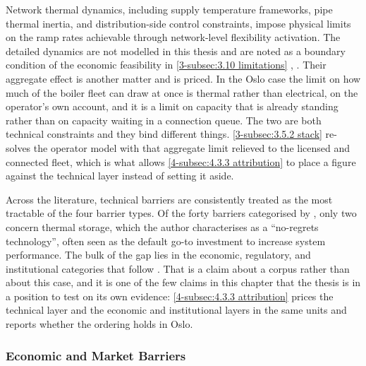 Network thermal dynamics, including supply temperature frameworks, pipe thermal inertia, and distribution-side control constraints, impose physical limits on the ramp rates achievable through network-level flexibility activation. The detailed dynamics are not modelled in this thesis and are noted as a boundary condition of the economic feasibility in \autoref{3-subsec:3.10 limitations} \cite{vandermeulen_controlling_2018}, \cite{guelpa_demand_2021}. Their aggregate effect is another matter and is priced. In the Oslo case the limit on how much of the boiler fleet can draw at once is thermal rather than electrical, on the operator's own account, and it is a limit on capacity that is already standing rather than on capacity waiting in a connection queue. The two are both technical constraints and they bind different things. \autoref{3-subsec:3.5.2 stack} re-solves the operator model with that aggregate limit relieved to the licensed and connected fleet, which is what allows \autoref{4-subsec:4.3.3 attribution} to place a figure against the technical layer instead of setting it aside.

Across the literature, technical barriers are consistently treated as the most tractable of the four barrier types. Of the forty barriers categorised by \cite{sneum_barriers_2021}, only two concern thermal storage, which the author characterises as a ``no-regrets technology'', often seen as the default go-to investment to increase system performance. The bulk of the gap lies in the economic, regulatory, and institutional categories that follow \cite{sneum_barriers_2021}. That is a claim about a corpus rather than about this case, and it is one of the few claims in this chapter that the thesis is in a position to test on its own evidence: \autoref{4-subsec:4.3.3 attribution} prices the technical layer and the economic and institutional layers in the same units and reports whether the ordering holds in Oslo.


\subsubsection{Economic and Market Barriers}
\label{2-subsec:2.3.2 market barriers}

